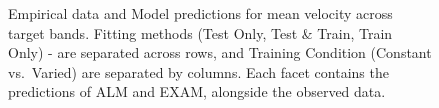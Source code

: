 \documentclass[
  12pt,
  letterpaper,
]{article}
\begin{document}
\begin{figure}


\caption{\label{fig-cm-vx-pat}Empirical data and Model predictions for
mean velocity across target bands. Fitting methods (Test Only, Test \&
Train, Train Only) - are separated across rows, and Training Condition
(Constant vs.~Varied) are separated by columns. Each facet contains the
predictions of ALM and EXAM, alongside the observed data.}

\end{figure}%
\end{document}
